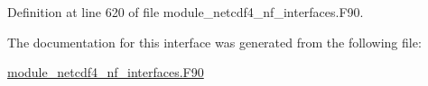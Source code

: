 Definition at line 620 of file module\+\_\+netcdf4\+\_\+nf\+\_\+interfaces.\+F90.



The documentation for this interface was generated from the following file\+:\begin{DoxyCompactItemize}
\item 
\hyperlink{module__netcdf4__nf__interfaces_8F90}{module\+\_\+netcdf4\+\_\+nf\+\_\+interfaces.\+F90}\end{DoxyCompactItemize}
